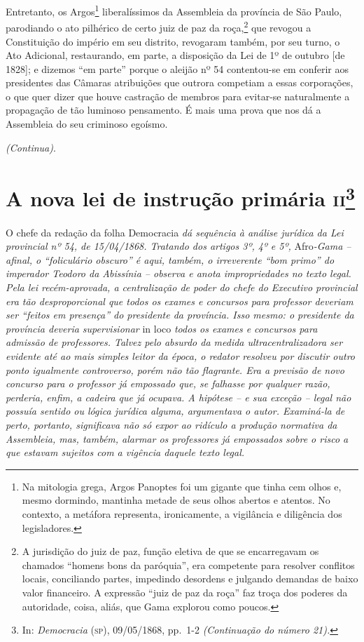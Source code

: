 Entretanto, os Argos\footnote{Na mitologia grega, Argos Panoptes foi
  um gigante que tinha cem olhos e, mesmo dormindo, mantinha metade de
  seus olhos abertos e atentos. No contexto, a metáfora representa,
  ironicamente, a vigilância e diligência dos legisladores.}
liberalíssimos da Assembleia da província de São Paulo, parodiando o ato
pilhérico de certo juiz de paz da roça,\footnote{A jurisdição do juiz
  de paz, função eletiva de que se encarregavam os chamados ``homens bons
  da paróquia'', era competente para resolver conflitos locais,
  conciliando partes, impedindo desordens e julgando demandas de baixo
  valor financeiro. A expressão ``juiz de paz da roça'' faz troça dos
  poderes da autoridade, coisa, aliás, que Gama explorou como poucos.}
que revogou a Constituição do império em seu distrito, revogaram também,
por seu turno, o Ato Adicional, restaurando, em parte, a disposição da
Lei de 1º de outubro {[}de 1828{]}; e dizemos ``em parte'' porque o
aleijão nº 54 contentou-se em conferir aos presidentes das Câmaras
atribuições que outrora competiam a essas corporações, o que quer dizer
que houve castração de membros para evitar-se naturalmente a propagação
de tão luminoso pensamento. É mais uma prova que nos dá a Assembleia do
seu criminoso egoísmo.

\emph{(Continua)}.

\chapter{A nova lei de instrução primária \textsc{ii}\footnote{In:
  \emph{Democracia} (\textsc{sp}), 09/05/1868, pp.~1-2 \emph{(Continuação do
  número 21).}}}

\begin{didascalia}
O chefe da redação da folha Democracia \emph{dá sequência à análise
jurídica da Lei provincial nº 54, de 15/04/1868. Tratando dos artigos
3º, 4º e 5º,} Afro\emph{-Gama -- afinal, o ``foliculário obscuro'' é
aqui, também, o irreverente ``bom primo'' do imperador Teodoro da
Abissínia -- observa e anota impropriedades no texto legal. Pela lei
recém-aprovada, a centralização de poder do chefe do Executivo
provincial era tão desproporcional que todos os exames e concursos para
professor deveriam ser ``feitos em presença'' do presidente da província.
Isso mesmo: o presidente da província deveria supervisionar} in loco
\emph{todos os exames e concursos para admissão de professores. Talvez
pelo absurdo da medida ultracentralizadora ser evidente até ao mais
simples leitor da época, o redator resolveu por discutir outro ponto
igualmente controverso, porém não tão flagrante. Era a previsão de novo
concurso para o professor já empossado que, se falhasse por qualquer
razão, perderia, enfim, a cadeira que já ocupava. A hipótese -- e sua
exceção -- legal não possuía sentido ou lógica jurídica alguma,
argumentava o autor. Examiná-la de perto, portanto, significava não só
expor ao ridículo a produção normativa da Assembleia, mas, também,
alarmar os professores já empossados sobre o risco a que estavam
sujeitos com a vigência daquele texto legal.}
\end{didascalia}




